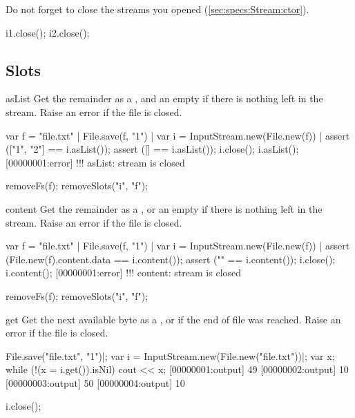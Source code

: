 Do not forget to close the streams you opened
(\autoref{sec:specs:Stream:ctor}).

\begin{urbiscript}
i1.close();
i2.close();
\end{urbiscript}

\subsection{Slots}

\begin{urbiscriptapi}
\item[asList]%
  Get the remainder as a , and an empty 
  if there is nothing left in the stream. Raise an error if the file is closed.
\begin{urbiscript}
var f = "file.txt" |
File.save(f, "1\n") |
var i = InputStream.new(File.new(f)) |
assert (["1", "2"] == i.asList());
assert ([] == i.asList());
i.close();
i.asList();
[00000001:error] !!! asList: stream is closed
\end{urbiscript}
\begin{urbicomment}
removeFs(f);
removeSlots("i", "f");
\end{urbicomment}

\item[content]%
  Get the remainder as a , or an empty  if
  there is nothing left in the stream. Raise an error if the file is closed.
\begin{urbiscript}
var f = "file.txt" |
File.save(f, "1\n") |
var i = InputStream.new(File.new(f)) |
assert (File.new(f).content.data == i.content());
assert ("" == i.content());
i.close();
i.content();
[00000001:error] !!! content: stream is closed
\end{urbiscript}
\begin{urbicomment}
removeFs(f);
removeSlots("i", "f");
\end{urbicomment}

\item[get]%
  Get the next available byte as a , or  if
  the end of file was reached.  Raise an error if the file is closed.
\begin{urbiscript}
File.save("file.txt", "1\n")|;
var i = InputStream.new(File.new("file.txt"))|;
var x;
while (!(x = i.get()).isNil)
  cout << x;
[00000001:output] 49
[00000002:output] 10
[00000003:output] 50
[00000004:output] 10

i.close();


\end{urbiscript}
\end{urbiscriptapi}
